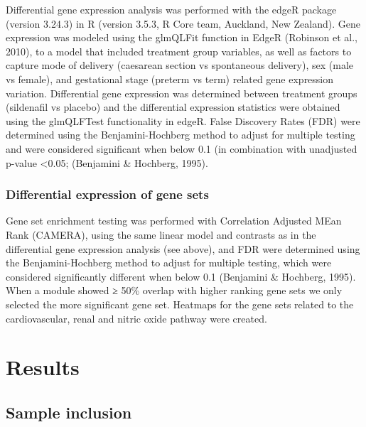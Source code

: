 \documentclass[authordate, empirical,issue]{jote-new-article}
\begin{document}
Differential gene expression analysis was performed with the edgeR package (version 3.24.3) in R (version 3.5.3, R Core team, Auckland, New Zealand). Gene expression was modeled using the glmQLFit function in EdgeR (Robinson et al., 2010), to a model that included treatment group variables, as well as factors to capture mode of delivery (caesarean section vs spontaneous delivery), sex (male vs female), and gestational stage (preterm vs term) related gene expression variation. Differential gene expression was determined between treatment groups (sildenafil vs placebo) and the differential expression statistics were obtained using the glmQLFTest functionality in edgeR. False Discovery Rates (FDR) were determined using the Benjamini-Hochberg method to adjust for multiple testing and were considered significant when below 0.1 (in combination with unadjusted p-value <0.05; (Benjamini \& Hochberg, 1995).







\subsubsection{Differential expression of gene sets}



Gene set enrichment testing was performed with Correlation Adjusted MEan Rank (CAMERA), using the same linear model and contrasts as in the differential gene expression analysis (see above), and FDR were determined using the Benjamini-Hochberg method to adjust for multiple testing, which were considered significantly different when below 0.1 (Benjamini \& Hochberg, 1995). When a module showed ≥ 50\% overlap with higher ranking gene sets we only selected the more significant gene set. Heatmaps for the gene sets related to the cardiovascular, renal and nitric oxide pathway were created.







\section{Results}







\subsection{Sample inclusion}
\end{document}
